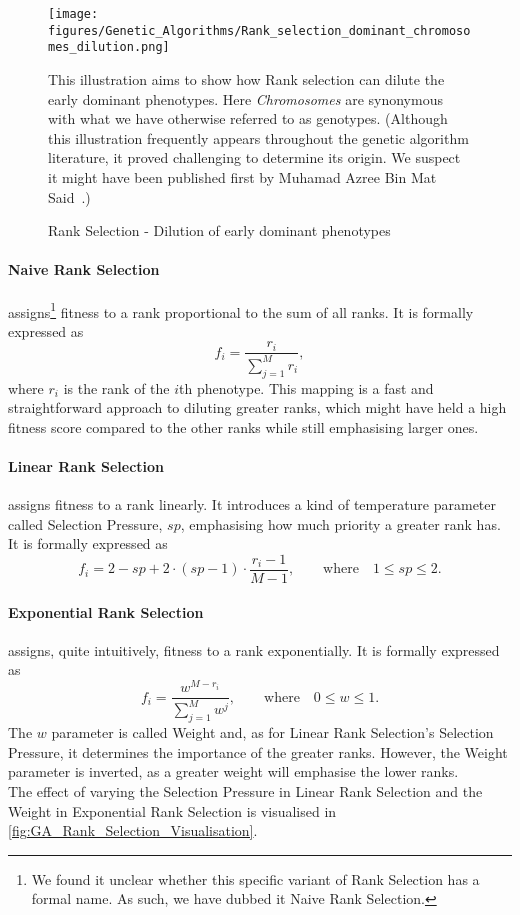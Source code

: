 \begin{figure}[H]
    \centering
    \texttt{[image: figures/Genetic\_Algorithms/Rank\_selection\_dominant\_chromosomes\_dilution.png]}
    \caption{Rank Selection - Dilution of early dominant phenotypes}
    \small
    \raggedright
    This illustration aims to show how Rank selection can dilute the early dominant phenotypes. Here \textit{Chromosomes} are synonymous with what we have otherwise referred to as genotypes. (Although this illustration frequently appears throughout the genetic algorithm literature, it proved challenging to determine its origin. We suspect it might have been published first by Muhamad Azree Bin Mat Said~\cite{Rank-Selection-Illustration-Origin}.) 
    \label{fig:GA_Rank_Selection}
\end{figure}

\paragraph{Naive Rank Selection} assigns\footnote{We found it unclear whether this specific variant of Rank Selection has a formal name. As such, we have dubbed it Naive Rank Selection.} fitness to a rank proportional to the sum of all ranks. It is formally expressed as
\begin{equation*}
    f_i = \frac{r_i}{\sum_{j = 1}^M r_i},
\end{equation*}
where $r_i$ is the rank of the $i$th phenotype. This mapping is a fast and straightforward approach to diluting greater ranks, which might have held a high fitness score compared to the other ranks while still emphasising larger ones.

\paragraph{Linear Rank Selection} assigns fitness to a rank linearly. It introduces a kind of temperature parameter called Selection Pressure, $sp$, emphasising how much priority a greater rank has. It is formally expressed as 
\begin{equation*}
    f_i = 2 - sp + 2 \cdot (sp - 1) \cdot \frac{r_i - 1}{M - 1}, \qquad \text{where} \quad 1 \leq sp \leq 2.
\end{equation*}

\paragraph{Exponential Rank Selection} assigns, quite intuitively, fitness to a rank exponentially. It is formally expressed as
\begin{equation*}
    f_i = \frac{w^{M - r_i}}{\sum_{j = 1}^M w^{j}}, \qquad \text{where} \quad 0 \leq w \leq 1.
\end{equation*}
The $w$ parameter is called Weight and, as for Linear Rank Selection's Selection Pressure, it determines the importance of the greater ranks. However, the Weight parameter is inverted, as a greater weight will emphasise the lower ranks.
\\
The effect of varying the Selection Pressure in Linear Rank Selection and the Weight in Exponential Rank Selection is visualised in \autoref{fig:GA_Rank_Selection_Visualisation}.


